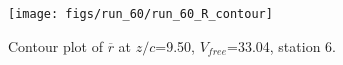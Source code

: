 \begin{figure}[H]
\centering
\texttt{[image: figs/run\_60/run\_60\_R\_contour]}
\caption{Contour plot of $\overline{r}$ at $z/c$=9.50, $V_{free}$=33.04, station 6.}
\end{figure}


